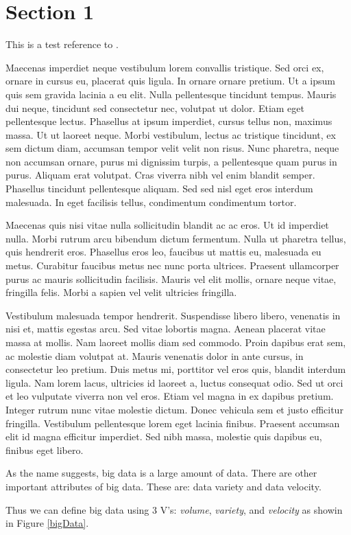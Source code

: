 \section{Section 1}

This is a test reference to \autocite{king_anthony_2022}.


Maecenas imperdiet neque vestibulum lorem convallis tristique. Sed orci ex, ornare in cursus eu, placerat quis ligula. In ornare ornare pretium. Ut a ipsum quis sem gravida lacinia a eu elit. Nulla pellentesque tincidunt tempus. Mauris dui neque, tincidunt sed consectetur nec, volutpat ut dolor. Etiam eget pellentesque lectus. Phasellus at ipsum imperdiet, cursus tellus non, maximus massa. Ut ut laoreet neque. Morbi vestibulum, lectus ac tristique tincidunt, ex sem dictum diam, accumsan tempor velit velit non risus. Nunc pharetra, neque non accumsan ornare, purus mi dignissim turpis, a pellentesque quam purus in purus. Aliquam erat volutpat. Cras viverra nibh vel enim blandit semper. Phasellus tincidunt pellentesque aliquam. Sed sed nisl eget eros interdum malesuada. In eget facilisis tellus, condimentum condimentum tortor.

Maecenas quis nisi vitae nulla sollicitudin blandit ac ac eros. Ut id imperdiet nulla. Morbi rutrum arcu bibendum dictum fermentum. Nulla ut pharetra tellus, quis hendrerit eros. Phasellus eros leo, faucibus ut mattis eu, malesuada eu metus. Curabitur faucibus metus nec nunc porta ultrices. Praesent ullamcorper purus ac mauris sollicitudin facilisis. Mauris vel elit mollis, ornare neque vitae, fringilla felis. Morbi a sapien vel velit ultricies fringilla.

Vestibulum malesuada tempor hendrerit. Suspendisse libero libero, venenatis in nisi et, mattis egestas arcu. Sed vitae lobortis magna. Aenean placerat vitae massa at mollis. Nam laoreet mollis diam sed commodo. Proin dapibus erat sem, ac molestie diam volutpat at. Mauris venenatis dolor in ante cursus, in consectetur leo pretium. Duis metus mi, porttitor vel eros quis, blandit interdum ligula. Nam lorem lacus, ultricies id laoreet a, luctus consequat odio. Sed ut orci et leo vulputate viverra non vel eros. Etiam vel magna in ex dapibus pretium. Integer rutrum nunc vitae molestie dictum. Donec vehicula sem et justo efficitur fringilla. Vestibulum pellentesque lorem eget lacinia finibus. Praesent accumsan elit id magna efficitur imperdiet. Sed nibh massa, molestie quis dapibus eu, finibus eget libero.

As the name suggests, big data is a large amount of data. There are other important attributes of big data. These are:  data variety and data velocity.

Thus we can define big data using 3 V's: \textit{volume}, \textit{variety}, and \textit{velocity} as showin in Figure \ref*{bigData}.